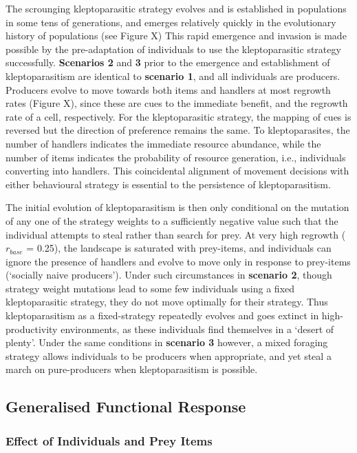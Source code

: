 \documentclass[11pt]{article}
\begin{document}
The scrounging kleptoparasitic strategy evolves and is established in populations in some tens of generations, and emerges relatively quickly in the evolutionary history of populations (see Figure X)
This rapid emergence and invasion is made possible by the pre-adaptation of individuals to use the kleptoparasitic strategy successfully.
\textbf{Scenarios 2} and \textbf{3} prior to the emergence and establishment of kleptoparasitism are identical to \textbf{scenario 1}, and all individuals are producers.
Producers evolve to move towards both items and handlers at most regrowth rates (Figure X), since these are cues to the immediate benefit, and the regrowth rate of a cell, respectively.
For the kleptoparasitic strategy, the mapping of cues is reversed but the direction of preference remains the same.
To kleptoparasites, the number of handlers indicates the immediate resource abundance, while the number of items indicates the probability of resource generation, i.e., individuals converting into handlers.
This coincidental alignment of movement decisions with either behavioural strategy is essential to the persistence of kleptoparasitism.

The initial evolution of kleptoparasitism is then only conditional on the mutation of any one of the strategy weights to a sufficiently negative value such that the individual attempts to steal rather than search for prey.
At very high regrowth ($r_{base}$ = 0.25), the landscape is saturated with prey-items, and individuals can ignore the presence of handlers and evolve to move only in response to prey-items (`socially naive producers').
Under such circumstances in \textbf{scenario 2}, though strategy weight mutations lead to some few individuals using a fixed kleptoparasitic strategy, they do not move optimally for their strategy.
Thus kleptoparasitism as a fixed-strategy repeatedly evolves and goes extinct in high-productivity environments, as these individuals find themselves in a `desert of plenty'.
Under the same conditions in \textbf{scenario 3} however, a mixed foraging strategy allows individuals to be producers when appropriate, and yet steal a march on pure-producers when kleptoparasitism is possible.

\subsection*{Generalised Functional Response}

\subsubsection*{Effect of Individuals and Prey Items}
\end{document}
